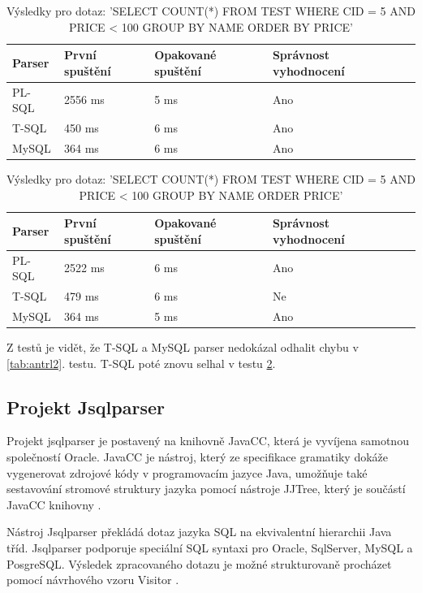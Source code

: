 \documentclass[czech,bachelor,public,dept460,male,cpdeclaration,twoside]{diploma}
\begin{document}
\begin{table}[!htbp]
	\centering
	\caption{Výsledky pro dotaz: 'SELECT COUNT(*) FROM TEST WHERE CID = 5 AND PRICE < 100 GROUP BY NAME ORDER BY PRICE'}
	\label{tab:antrl3}
	\begin{tabular}{lllll}
		\toprule
		Parser & První spuštění & Opakované spuštění & Správnost vyhodnocení\\
		\midrule
		PL-SQL & 2556 ms & 5 ms & Ano \\
        T-SQL & 450 ms & 6 ms & Ano \\
        MySQL & 364 ms & 6 ms & Ano \\
		\midrule
	\end{tabular}
\end{table}

\begin{table}[!htbp]
	\centering
	\caption{Výsledky pro dotaz: 'SELECT COUNT(*) FROM TEST WHERE CID = 5 AND PRICE < 100 GROUP BY NAME ORDER PRICE'}
	\label{tab:antrl4}
	\begin{tabular}{lllll}
		\toprule
		Parser & První spuštění & Opakované spuštění & Správnost vyhodnocení\\
		\midrule
		PL-SQL & 2522 ms & 6 ms & Ano \\
        T-SQL & 479 ms & 6 ms & Ne \\
        MySQL & 364 ms & 5 ms & Ano \\
		\midrule
	\end{tabular}
\end{table}


Z testů je vidět, že T-SQL a MySQL parser nedokázal odhalit chybu v \ref{tab:antrl2}. testu. T-SQL poté znovu selhal v testu \ref{tab:antrl4}.


\subsection{Projekt Jsqlparser}
Projekt jsqlparser je postavený na knihovně JavaCC, která je vyvíjena samotnou společností Oracle. JavaCC je nástroj, který ze specifikace gramatiky dokáže vygenerovat zdrojové kódy v programovacím jazyce Java, umožňuje také sestavování stromové struktury jazyka pomocí nástroje JJTree, který je součástí JavaCC knihovny \cite{jsql}.


Nástroj Jsqlparser překládá dotaz jazyka SQL na ekvivalentní hierarchii Java tříd. Jsqlparser podporuje speciální SQL syntaxi pro Oracle, SqlServer, MySQL a PosgreSQL. Výsledek zpracovaného dotazu je možné strukturovaně procházet pomocí návrhového vzoru Visitor \cite{jsqld}.
\end{document}
